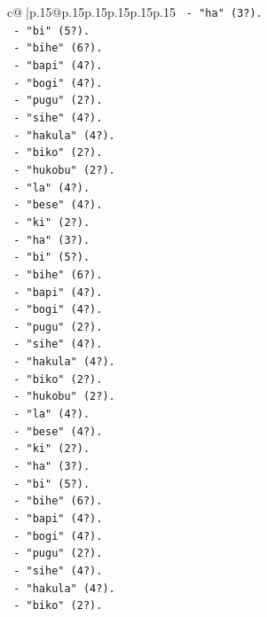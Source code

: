 \documentclass{article}
\begin{document}
{\begin{supertabular}{c@{$\;$}|p{.15\linewidth}@{}p{.15\linewidth}p{.15\linewidth}p{.15\linewidth}p{.15\linewidth}p{.15\linewidth}}
{{{\texttt{       {-} "ha" (3?).} \\
\texttt{       {-} "bi" (5?).} \\
\texttt{       {-} "bihe" (6?).} \\
\texttt{       {-} "bapi" (4?).} \\
\texttt{       {-} "bogi" (4?).} \\
\texttt{       {-} "pugu" (2?).} \\
\texttt{       {-} "sihe" (4?).} \\
\texttt{       {-} "hakula" (4?).} \\
\texttt{       {-} "biko" (2?).} \\
\texttt{       {-} "hukobu" (2?).} \\
\texttt{       {-} "la" (4?).} \\
\texttt{       {-} "bese" (4?).} \\
\texttt{       {-} "ki" (2?).} \\
\texttt{       {-} "ha" (3?).} \\
\texttt{       {-} "bi" (5?).} \\
\texttt{       {-} "bihe" (6?).} \\
\texttt{       {-} "bapi" (4?).} \\
\texttt{       {-} "bogi" (4?).} \\
\texttt{       {-} "pugu" (2?).} \\
\texttt{       {-} "sihe" (4?).} \\
\texttt{       {-} "hakula" (4?).} \\
\texttt{       {-} "biko" (2?).} \\
\texttt{       {-} "hukobu" (2?).} \\
\texttt{       {-} "la" (4?).} \\
\texttt{       {-} "bese" (4?).} \\
\texttt{       {-} "ki" (2?).} \\
\texttt{       {-} "ha" (3?).} \\
\texttt{       {-} "bi" (5?).} \\
\texttt{       {-} "bihe" (6?).} \\
\texttt{       {-} "bapi" (4?).} \\
\texttt{       {-} "bogi" (4?).} \\
\texttt{       {-} "pugu" (2?).} \\
\texttt{       {-} "sihe" (4?).} \\
\texttt{       {-} "hakula" (4?).} \\
\texttt{       {-} "biko" (2?).} \\
}}}
\end{supertabular}}
\end{document}
